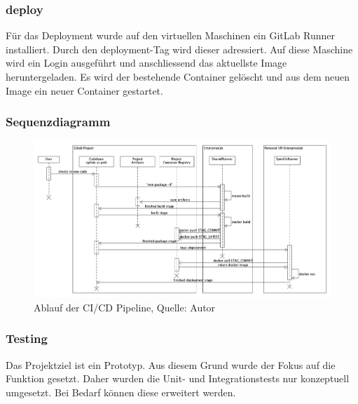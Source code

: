 \subsubsection{deploy}
Für das Deployment wurde auf den virtuellen Maschinen ein GitLab Runner installiert. Durch den deployment-Tag wird dieser adressiert. Auf diese Maschine wird ein Login ausgeführt und anschliessend das aktuellste Image heruntergeladen. Es wird der bestehende Container gelöscht und aus dem neuen Image ein neuer Container gestartet. 

\subsubsection{Sequenzdiagramm}
\begin{figure}[H]
	\centering
	\includegraphics[width=1\textwidth]{images/sequenceCicd.png}
	\caption[Ablauf der CI/CD Pipeline]{Ablauf der CI/CD Pipeline, Quelle: Autor}
	\label{img: cicdPipeline}
\end{figure}


\subsubsection{Testing}
Das Projektziel ist ein Prototyp. Aus diesem Grund wurde der Fokus auf die Funktion gesetzt. Daher wurden die Unit- und Integrationstests nur konzeptuell umgesetzt. Bei Bedarf können diese erweitert werden. 

\newpage